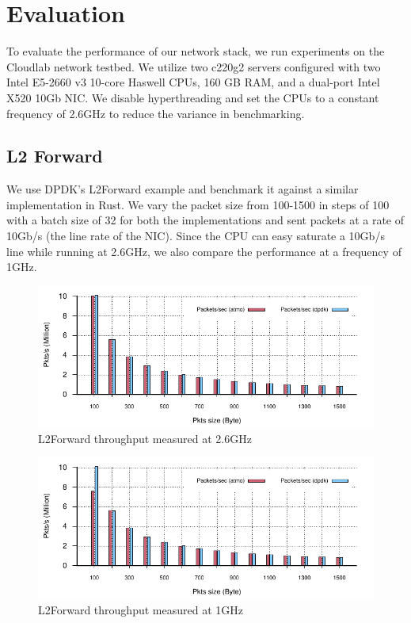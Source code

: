 \chapter{Evaluation} 

\label{Chapter5}

To evaluate the performance of our network stack, we run experiments on the Cloudlab\cite{cloudlab} network testbed. We utilize two c220g2 servers  configured with two Intel E5-2660 v3 10-core Haswell CPUs, 160 GB RAM, and a dual-port Intel X520 10Gb NIC. We disable hyperthreading and set the CPUs to a constant frequency of 2.6GHz to reduce the variance in benchmarking. 

\section{L2 Forward}
We use DPDK's L2Forward\cite{dpdk} example and benchmark it against a similar implementation in Rust. We vary the packet size from 100-1500 in steps of 100 with a batch size of 32 for both the implementations and sent packets at a rate of 10Gb/s (the line rate of the NIC). Since the CPU can easy saturate a 10Gb/s line while running at 2.6GHz, we also compare the performance at a frequency of 1GHz. 

\begin{figure}[!htbp]
	\includegraphics[width=1.0\columnwidth]{figures/l2fwd26.pdf}
\caption{L2Forward throughput measured at 2.6GHz}
	\label{fig:l2fwd26}
\end{figure}

\begin{figure}[!htbp]
	\includegraphics[width=1.0\columnwidth]{figures/l2fwd26@1ghz.pdf}
\caption{L2Forward throughput measured at 1GHz}
	\label{fig:l2fwd1}
\end{figure}

